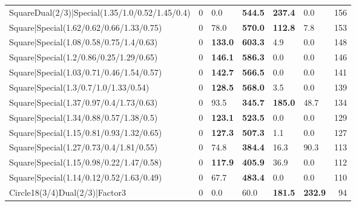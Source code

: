 \begin{tabular}{lrllllr}
 SquareDual(2/3)|Special(1.35/1.0/0.52/1.45/0.4)               &             0   & 0.0            & \textbf{544.5}  & \textbf{237.4}  & 0.0             &          156 \\
 Square|Special(1.62/0.62/0.66/1.33/0.75)                      &             0   & 78.0           & \textbf{570.0}  & \textbf{112.8}  & 7.8             &          153 \\
 Square|Special(1.08/0.58/0.75/1.4/0.63)                       &             0   & \textbf{133.0} & \textbf{603.3}  & 4.9             & 0.0             &          148 \\
 Square|Special(1.2/0.86/0.25/1.29/0.65)                       &             0   & \textbf{146.1} & \textbf{586.3}  & 0.0             & 0.0             &          146 \\
 Square|Special(1.03/0.71/0.46/1.54/0.57)                      &             0   & \textbf{142.7} & \textbf{566.5}  & 0.0             & 0.0             &          141 \\
 Square|Special(1.3/0.7/1.0/1.33/0.54)                         &             0   & \textbf{128.5} & \textbf{568.0}  & 3.5             & 0.0             &          139 \\
 Square|Special(1.37/0.97/0.4/1.73/0.63)                       &             0   & 93.5           & \textbf{345.7}  & \textbf{185.0}  & 48.7            &          134 \\
 Square|Special(1.34/0.88/0.57/1.38/0.5)                       &             0   & \textbf{123.1} & \textbf{523.5}  & 0.0             & 0.0             &          129 \\
 Square|Special(1.15/0.81/0.93/1.32/0.65)                      &             0   & \textbf{127.3} & \textbf{507.3}  & 1.1             & 0.0             &          127 \\
 Square|Special(1.27/0.73/0.4/1.81/0.55)                       &             0   & 74.8           & \textbf{384.4}  & 16.3            & 90.3            &          113 \\
 Square|Special(1.15/0.98/0.22/1.47/0.58)                      &             0   & \textbf{117.9} & \textbf{405.9}  & 36.9            & 0.0             &          112 \\
 Square|Special(1.14/0.12/0.52/1.63/0.49)                      &             0   & 67.7           & \textbf{483.4}  & 0.0             & 0.0             &          110 \\
 Circle18(3/4)Dual(2/3)|Factor3                                &             0   & 0.0            & 60.0            & \textbf{181.5}  & \textbf{232.9}  &           94 \\

\end{tabular}
